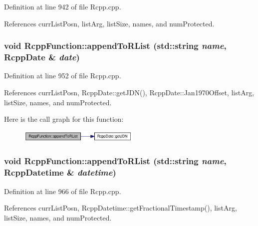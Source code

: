 Definition at line 942 of file Rcpp.cpp.

References currListPosn, listArg, listSize, names, and numProtected.\hypertarget{classRcppFunction_9aab0b3accb81d90fb813acf3bf4c49d}{
\subsubsection[appendToRList]{\setlength{\rightskip}{0pt plus 5cm}void RcppFunction::appendToRList (std::string {\em name}, \/  {\bf RcppDate} \& {\em date})}}
\label{classRcppFunction_9aab0b3accb81d90fb813acf3bf4c49d}




Definition at line 952 of file Rcpp.cpp.

References currListPosn, RcppDate::getJDN(), RcppDate::Jan1970Offset, listArg, listSize, names, and numProtected.

Here is the call graph for this function:\nopagebreak
\begin{figure}[H]
\begin{center}
\leavevmode
\includegraphics[width=163pt]{classRcppFunction_9aab0b3accb81d90fb813acf3bf4c49d_cgraph}
\end{center}
\end{figure}
\hypertarget{classRcppFunction_0be4ab064287c2d3a5c3b883a1707d70}{
\subsubsection[appendToRList]{\setlength{\rightskip}{0pt plus 5cm}void RcppFunction::appendToRList (std::string {\em name}, \/  {\bf RcppDatetime} \& {\em datetime})}}
\label{classRcppFunction_0be4ab064287c2d3a5c3b883a1707d70}




Definition at line 966 of file Rcpp.cpp.

References currListPosn, RcppDatetime::getFractionalTimestamp(), listArg, listSize, names, and numProtected.

